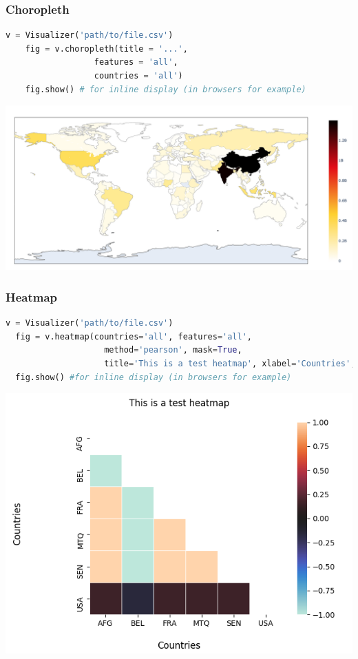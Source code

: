\begin{frame}[fragile,shrink=30]
   \frametitle{Choropleth}
   \begin{lstlisting}[language=Python]
    v = Visualizer('path/to/file.csv')
    fig = v.choropleth(title = '...',
                  features = 'all',
                  countries = 'all')
    fig.show() # for inline display (in browsers for example)
    \end{lstlisting}
    \begin{center}
        \includegraphics[scale=0.4]{beamer/inc/graphics/choropleth.png} 
    \end{center}
\end{frame}

\begin{frame}[fragile,shrink=30]
  \frametitle{Heatmap}
  \begin{lstlisting}[language=Python]
  v = Visualizer('path/to/file.csv')
  fig = v.heatmap(countries='all', features='all',
                    method='pearson', mask=True,
                    title='This is a test heatmap', xlabel='Countries', ylabel='Countries')
  fig.show() #for inline display (in browsers for example)
  \end{lstlisting}
  \begin{center}
    \includegraphics[scale=0.6]{beamer/inc/graphics/heatmap.png}
    \end{center}
\end{frame}

